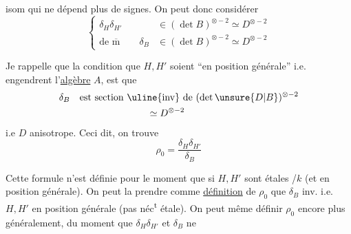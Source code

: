 isom qui ne dépend plus de signes.  On peut donc considérer
\[
\left\{\begin{aligned} \delta_H\delta_{H'}&\in(\det B)^{\otimes-2}\simeq D^{\otimes-2}\\ \text{de }\overline{\mathrm m}\qquad\delta_B&\in(\det B)^{\otimes-2}\simeq D^{\otimes-2}
\end{aligned}\right.
\]

Je rappelle que la  condition que $H,H'$ soient ``en position générale'' i.e. engendrent l'\uline{algèbre} $A$, est que
\[
\begin{aligned}
\delta_B\quad&\text{est section \uline{inv} de }(\det\unsure{D|B})^{\otimes-2}\\ &\hspace{7em}\simeq D^{\otimes-2}
\end{aligned}
\]
i.e $D$ anisotrope. Ceci dit, on trouve 
\[
\boxed{\rho_0=\frac{\delta_H\delta_{H'}}{\delta_B}}
\]

Cette formule n'est définie pour le moment que si $H,H'$ sont étales /$k$ (et en position générale). On peut la prendre comme \uline{définition} de $\rho_0$  que $\delta_B$ inv. i.e. $H,H'$ en position générale (pas néc\textsuperscript{t} étale). On peut même définir $\rho_0$ encore plus généralement, du moment que $\delta_H\delta_{H'}$ et $\delta_B$ ne

